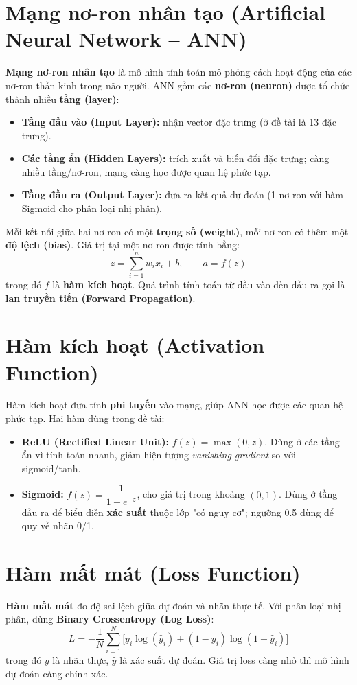 \section{Mạng nơ-ron nhân tạo (Artificial Neural Network -- ANN)}
\textbf{Mạng nơ-ron nhân tạo} là mô hình tính toán mô phỏng cách hoạt động của
các nơ-ron thần kinh trong não người. ANN gồm các \textbf{nơ-ron (neuron)} được
tổ chức thành nhiều \textbf{tầng (layer)}:
\begin{itemize}
  \item \textbf{Tầng đầu vào (Input Layer):} nhận vector đặc trưng (ở đề tài là
        13 đặc trưng).
  \item \textbf{Các tầng ẩn (Hidden Layers):} trích xuất và biến đổi đặc trưng;
        càng nhiều tầng/nơ-ron, mạng càng học được quan hệ phức tạp.
  \item \textbf{Tầng đầu ra (Output Layer):} đưa ra kết quả dự đoán (1 nơ-ron
        với hàm Sigmoid cho phân loại nhị phân).
\end{itemize}

Mỗi kết nối giữa hai nơ-ron có một \textbf{trọng số (weight)}, mỗi nơ-ron có
thêm một \textbf{độ lệch (bias)}. Giá trị tại một nơ-ron được tính bằng:
\begin{equation}
  z = \sum_{i=1}^{n} w_i x_i + b, \qquad a = f(z)
\end{equation}
trong đó $f$ là \textbf{hàm kích hoạt}. Quá trình tính toán từ đầu vào đến đầu ra
gọi là \textbf{lan truyền tiến (Forward Propagation)}.

\section{Hàm kích hoạt (Activation Function)}
Hàm kích hoạt đưa tính \textbf{phi tuyến} vào mạng, giúp ANN học được các quan
hệ phức tạp. Hai hàm dùng trong đề tài:
\begin{itemize}
  \item \textbf{ReLU (Rectified Linear Unit):} $f(z) = \max(0, z)$. Dùng ở các
        tầng ẩn vì tính toán nhanh, giảm hiện tượng \emph{vanishing gradient} so
        với sigmoid/tanh.
  \item \textbf{Sigmoid:} $f(z) = \dfrac{1}{1 + e^{-z}}$, cho giá trị trong
        khoảng $(0, 1)$. Dùng ở tầng đầu ra để biểu diễn \textbf{xác suất}
        thuộc lớp "có nguy cơ"; ngưỡng 0.5 dùng để quy về nhãn 0/1.
\end{itemize}

\section{Hàm mất mát (Loss Function)}
\textbf{Hàm mất mát} đo độ sai lệch giữa dự đoán và nhãn thực tế. Với phân loại
nhị phân, dùng \textbf{Binary Crossentropy (Log Loss)}:
\begin{equation}
  L = -\frac{1}{N} \sum_{i=1}^{N} \Big[ y_i \log(\hat{y}_i) + (1-y_i)\log(1-\hat{y}_i) \Big]
\end{equation}
trong đó $y$ là nhãn thực, $\hat{y}$ là xác suất dự đoán. Giá trị loss càng nhỏ
thì mô hình dự đoán càng chính xác.

